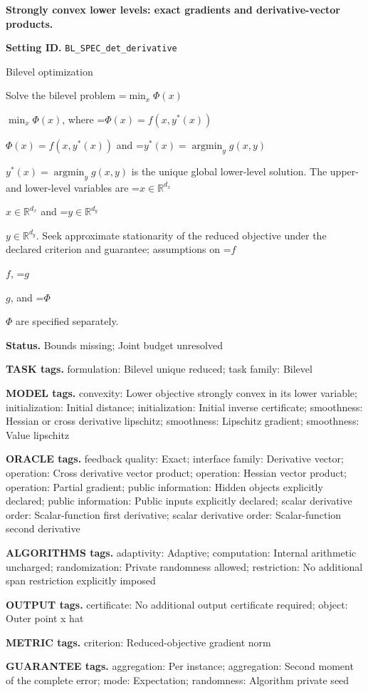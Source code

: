 \documentclass[10pt,a4paper]{article}
\newcommand{\AtlasMath}[1]{\par\begingroup\centering\setbox0=\hbox{$\displaystyle #1$}\ifdim\wd0>1.4\linewidth\typeout{ATLAS WIDE FORMULA: \the\wd0}\fi\ifdim\wd0>\linewidth\resizebox{\linewidth}{!}{\box0}\else\box0\fi\par\endgroup}
\newcommand{\AtlasInlineMath}[1]{\begingroup\setbox0=\hbox{$#1$}\ifdim\wd0>.4\linewidth\endgroup\AtlasMath{#1}\else\endgroup$#1$\fi}
\begin{document}
\raggedright

{\LARGE\bfseries\sffamily\color{AtlasNavy} Strongly convex lower levels: exact gradients and derivative-vector products.\par}\vspace{5pt}
\textbf{Setting ID.} \texttt{BL\_\allowbreak{}SPEC\_\allowbreak{}det\_\allowbreak{}derivative}

Bilevel optimization

Solve the bilevel problem \AtlasInlineMath{\min_x\Phi(x)}, where \AtlasInlineMath{\Phi(x)=f(x,y^*(x))} and \AtlasInlineMath{y^*(x)=\operatorname*{argmin}_y g(x,y)} is the unique global lower-level solution. The upper- and lower-level variables are \AtlasInlineMath{x\in\mathbb{R}^{d_x}} and \AtlasInlineMath{y\in\mathbb{R}^{d_y}}. Seek approximate stationarity of the reduced objective under the declared criterion and guarantee; assumptions on \AtlasInlineMath{f}, \AtlasInlineMath{g}, and \AtlasInlineMath{\Phi} are specified separately.

\textbf{Status.} Bounds missing; Joint budget unresolved

\textbf{TASK tags.} formulation: Bilevel unique reduced; task family: Bilevel

\textbf{MODEL tags.} convexity: Lower objective strongly convex in its lower variable; initialization: Initial distance; initialization: Initial inverse certificate; smoothness: Hessian or cross derivative lipschitz; smoothness: Lipschitz gradient; smoothness: Value lipschitz

\textbf{ORACLE tags.} feedback quality: Exact; interface family: Derivative vector; operation: Cross derivative vector product; operation: Hessian vector product; operation: Partial gradient; public information: Hidden objects explicitly declared; public information: Public inputs explicitly declared; scalar derivative order: Scalar-function first derivative; scalar derivative order: Scalar-function second derivative

\textbf{ALGORITHMS tags.} adaptivity: Adaptive; computation: Internal arithmetic uncharged; randomization: Private randomness allowed; restriction: No additional span restriction explicitly imposed

\textbf{OUTPUT tags.} certificate: No additional output certificate required; object: Outer point x hat

\textbf{METRIC tags.} criterion: Reduced-objective gradient norm

\textbf{GUARANTEE tags.} aggregation: Per instance; aggregation: Second moment of the complete error; mode: Expectation; randomness: Algorithm private seed
\end{document}
